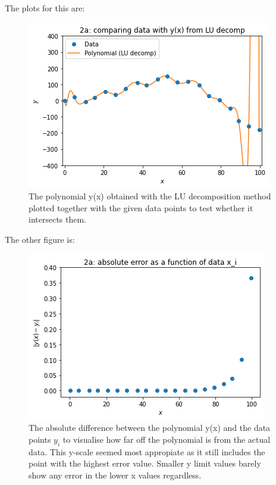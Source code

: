 

The plots for this are:

\begin{figure}[h!]
  \centering
  \includegraphics[width=0.6\linewidth]{problem2a1.png}
  \caption{The polynomial y(x) obtained with the LU decomposition method plotted together with the given data points to test whether it intersects them.}
  \label{fig:fig1}
\end{figure}

The other figure is: 

\begin{figure}[h!]
  \centering
  \includegraphics[width=0.6\linewidth]{problem2a2.png}
  \caption{The absolute difference between the polynomial y(x) and the data points $y_i$ to visualise how far off the polynomial is from the actual data. This y-scale seemed most appropiate as it still includes the point with the highest error value. Smaller y limit values barely show any error in the lower x values regardless.}
  \label{fig:fig2}
\end{figure}